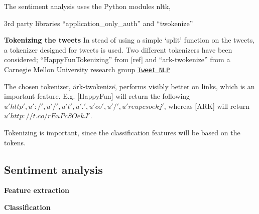 \documentclass[Main]{subfiles}
\begin{document}



The sentiment analysis uses the Python modules nltk, 

3rd party libraries ``application\_only\_auth'' and ``twokenize''



\textbf{Tokenizing the tweets}
In stead of using a simple `split' function on the tweets, a tokenizer designed for tweets is used. Two different tokenizers have been considered; ``HappyFunTokenizing'' from [ref] and ``ark-twokenize'' from a Carnegie Mellon University research group \href{http://www.ark.cs.cmu.edu/TweetNLP/}{\tt Tweet NLP}

The chosen tokenizer, \"ark-twokenize\", performs visibly better on links, which is an important feature. E.g. [HappyFun] will return the following ${u'http', u':/', u'/', u't', u'.', u'co', u'/', u'reupcsoekj'}$, whereas [ARK] will return ${u'http://t.co/rEuPcSOekJ'}$. 

Tokenizing is important, since the classification features will be based on the tokens. 



\subsection{Sentiment analysis}

\textbf{Feature extraction}


\textbf{Classification}
\end{document}
